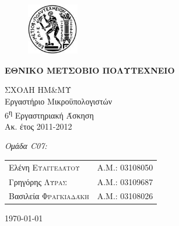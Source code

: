 \begin{titlepage}
\begin{center}
\begin{figure}[h] 
     \includegraphics[width=0.2\textwidth]{title/ntua_logo}
\end{figure}
\vspace{1cm}
\begin{LARGE}\textbf{ΕΘΝΙΚΟ ΜΕΤΣΟΒΙΟ ΠΟΛΥΤΕΧΝΕΙΟ\\[1.5cm]}\end{LARGE}
\begin{Large}
ΣΧΟΛΗ ΗΜ\&ΜΥ\\
Εργαστήριο Μικροϋπολογιστών\\[2cm]
6\textsuperscript{η} Εργαστηριακή Άσκηση\\
Ακ. έτος 2011-2012\\
\end{Large}
\vfill
\begin{flushright}
\Large \textit{Ομάδα C07:}\\[1cm]
\begin{tabular}{l r}
{Ελένη \textsc{Ευαγγελάτου}}&
{Α.Μ.: 03108050}\\
{Γρηγόρης \textsc{Λύρας}}&
{Α.Μ.: 03109687}\\
{Βασιλεία \textsc{Φραγκιαδάκη}}&
{Α.Μ.: 03108026}\\
\end{tabular}
\end{flushright}

\large\today\\
\end{center}
\end{titlepage}


